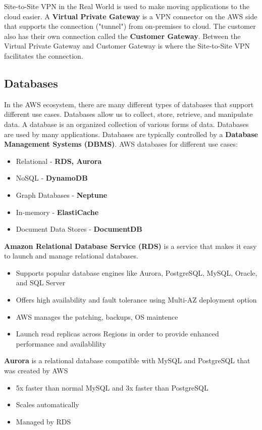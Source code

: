 \documentclass{article}%
\begin{document}
Site-to-Site VPN in the Real World is used to make moving applications to the cloud easier. A \textbf{Virtual Private Gateway} is a VPN connector on the AWS side that supports the connection ("tunnel") from on-premises to cloud. The customer also has their own connection called the \textbf{Customer Gateway}. Between the Virtual Private Gateway and Customer Gateway is where the Site-to-Site VPN facilitates the connection.

\subsection{Databases}
In the AWS ecosystem, there are many different types of databases that support different use cases. Databases allow us to collect, store, retrieve, and manipulate data. A database is an organized collection of various forms of data. Databases are used by many applications. Databases are typically controlled by a \textbf{Database Management Systems (DBMS)}. AWS databases for different use cases:
\begin{itemize}
    \item Relational - \textbf{RDS, Aurora}
    \item NoSQL - \textbf{DynamoDB}
    \item Graph Databases - \textbf{Neptune}
    \item In-memory - \textbf{ElastiCache}
    \item Document Data Stores - \textbf{DocumentDB}
\end{itemize} 
\textbf{Amazon Relational Database Service (RDS)} is a service that makes it easy to launch and manage relational databases.
\begin{itemize}
    \item Supports popular database engines like Aurora, PostgreSQL, MySQL, Oracle, and SQL Server
    \item Offers high availability and fault tolerance using Multi-AZ deployment option
    \item AWS manages the patching, backups, OS maintence
    \item Launch read replicas across Regions in order to provide enhanced performance and availablility
\end{itemize}
\textbf{Aurora} is a relational database compatible with MySQL and PostgreSQL that was created by AWS
\begin{itemize}
    \item 5x faster than normal MySQL and 3x faster than PostgreSQL
    \item Scales automatically
    \item Managed by RDS
\end{itemize}
\end{document}
